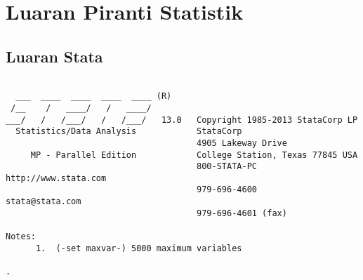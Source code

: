 \clearpage
\chapter{Luaran Piranti Statistik}
\setcounter{table}{0}
\renewcommand{\thetable}{B-\arabic{table}}
\setcounter{figure}{0}
\renewcommand{\thefigure}{B-\arabic{figure}}
\setcounter{page}{1}
\renewcommand{\thepage}{B-\arabic{page}}




\section*{Luaran Stata}
\begin{table}
\centering \footnotesize
\begin{verbatim}

  ___  ____  ____  ____  ____ (R)
 /__    /   ____/   /   ____/
___/   /   /___/   /   /___/   13.0   Copyright 1985-2013 StataCorp LP
  Statistics/Data Analysis            StataCorp
                                      4905 Lakeway Drive
     MP - Parallel Edition            College Station, Texas 77845 USA
                                      800-STATA-PC        http://www.stata.com
                                      979-696-4600        stata@stata.com
                                      979-696-4601 (fax)

Notes:
      1.  (-set maxvar-) 5000 maximum variables

. 

\end{verbatim}
\end{table}

